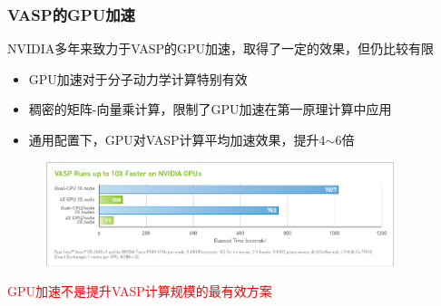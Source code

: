 \frame
{
	\frametitle{\textrm{VASP}的\textrm{GPU}加速}
\textrm{NVIDIA}多年来致力于\textrm{VASP}的\textrm{GPU}加速，取得了一定的效果，但仍比较有限
\begin{itemize}
	\item \textrm{GPU}加速对于分子动力学计算特别有效
	\item 稠密的矩阵-向量乘计算，限制了\textrm{GPU}加速在第一原理计算中应用
	\item 通用配置下，\textrm{GPU}对\textrm{VASP}计算平均加速效果，提升\textrm{4$\sim$6}倍
\end{itemize}
\begin{figure}[h!]
	\vspace{-0.15in}
\centering
\includegraphics[height=1.2in,width=4.05in,viewport=0 0 850 260,clip]{Figures/VASP-GPU-CPU.png}
\label{VASP_GPU}
\end{figure} 
	\vspace{-0.15in}
\textcolor{red}{\textrm{GPU}加速不是提升\textrm{VASP}计算规模的最有效方案}
}

